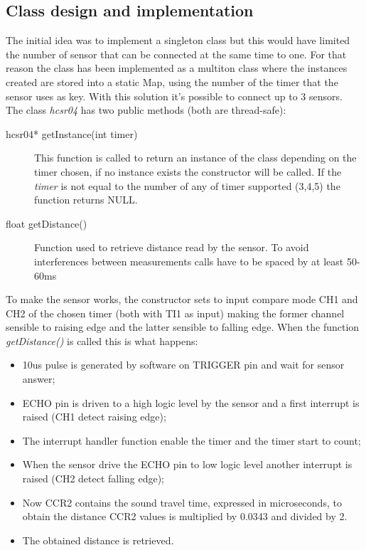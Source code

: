 \subsection{Class design and implementation}
The initial idea was to implement a singleton class but this would have limited the number of sensor that can be connected at the same time to one.
For that reason the class has been implemented as a multiton class where the instances created are stored into a static Map, using the number of the timer that the sensor uses as key. With this solution it's possible to connect up to 3 sensors.\\
The class \textit{hcsr04} has two public methods (both are thread-safe):
\begin{description}
\item [hcsr04* getInstance(int \textunderscore timer)] This function is called to return an instance of the class depending on the timer chosen, if no instance exists the constructor will be called. If the \textit{ \textunderscore timer} is not equal to the number of any of timer supported (3,4,5) the function returns NULL.
\item [float getDistance()] Function used to retrieve distance read by the sensor. To avoid interferences between measurements calls have to be spaced by at least 50-60ms
\end{description}

To make the sensor works, the constructor sets to input compare mode CH1 and CH2 of the chosen timer (both with TI1 as input) making the former channel sensible to raising edge and the latter sensible to falling edge. 
When the function \textit{getDistance()} is called this is what happens:
\begin{itemize}
\item 10us pulse is generated by software on TRIGGER pin and wait for sensor answer;
\item ECHO pin is driven to a high logic level by the sensor and a first interrupt is raised (CH1 detect raising edge);
\item The interrupt handler function enable the timer and the timer start to count;
\item When the sensor drive the ECHO pin to low logic level another interrupt is raised (CH2 detect falling edge);
\item Now CCR2 contains the sound travel time, expressed in microseconds, to obtain the distance CCR2 values is multiplied by 0.0343 and divided by 2.
\item The obtained distance is retrieved.
\end{itemize}

